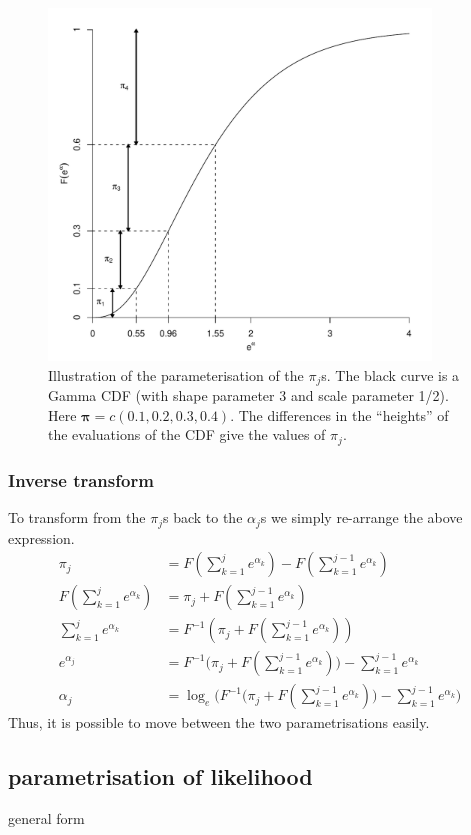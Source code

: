 \begin{figure}
\centering
\includegraphics[width=4in]{mix/figs/pidia.pdf}
\caption{Illustration of the parameterisation of the $\pi_j$s. The black curve is a Gamma CDF (with shape parameter 3 and scale parameter 1/2). Here $\bm{\pi}=c(0.1,0.2,0.3,0.4)$. The differences in the ``heights'' of the evaluations of the CDF give the values of $\pi_j$.}
\label{dlbpi}
\end{figure}

\subsubsection{Inverse transform}
To transform from the $\pi_j$s back to the $\alpha_j$s we simply re-arrange the above expression.
\begin{align*}
\pi_j &= F(\sum_{k=1}^j e^{\alpha_k}) - F(\sum_{k=1}^{j-1} e^{\alpha_k})\\
F(\sum_{k=1}^j e^{\alpha_k}) &= \pi_j + F(\sum_{k=1}^{j-1} e^{\alpha_k})\\
\sum_{k=1}^j e^{\alpha_k} &= F^{-1}(\pi_j + F(\sum_{k=1}^{j-1} e^{\alpha_k}))\\
e^{\alpha_j} &= F^{-1}\Big(\pi_j + F(\sum_{k=1}^{j-1} e^{\alpha_k})\Big) - \sum_{k=1}^{j-1} e^{\alpha_k}\\
\alpha_j &= \log_e \Big(F^{-1}\Big(\pi_j + F(\sum_{k=1}^{j-1} e^{\alpha_k})\Big) - \sum_{k=1}^{j-1} e^{\alpha_k}\Big)
\end{align*}
Thus, it is possible to move between the two parametrisations easily.

\subsection{parametrisation of likelihood}
general form

